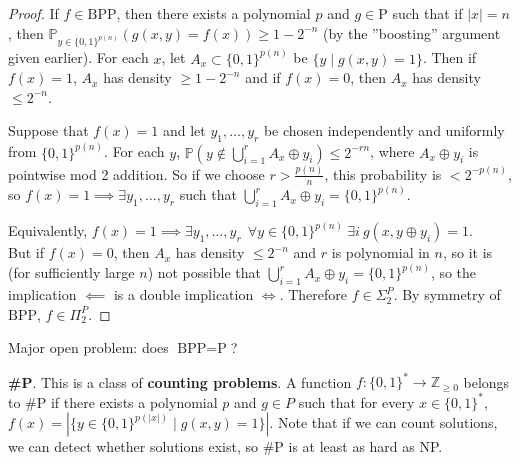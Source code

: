 \documentclass{article}
\theoremstyle{definition}
\begin{document}
\begin{proof}
    If $f \in \text{BPP}$, then there exists a polynomial $p$ and $g \in \text{P}$ such that if $\left|x\right|=n$, then $\mathbb{P}_{y \in \{0,1\}^{p(n)}}\left(g(x,y)=f(x)\right) \ge 1 -2^{-n}$ (by the ''boosting'' argument given earlier). For each $x$, let $A_x \subset \{0,1\}^{p(n)}$ be $\{y \mid g(x,y) =1\}$. Then if $f(x)=1$, $A_x$ has density $\ge 1-2^{-n}$ and if $f(x)=0$, then $A_x$ has density $\le 2^{-n}$. 

    \vspace{1mm}
     
    Suppose that $f(x)=1$ and let $y_1,\ldots,y_r$ be chosen independently and uniformly from $\{0,1\}^{p(n)}$. For each $y$, $\mathbb{P}\left(y \not\in \bigcup_{i=1}^r A_x \oplus y_i \right) \le 2^{-rn}$, where $A_x \oplus y_i$ is pointwise mod 2 addition. So if we choose $r > \frac{p(n)}{n}$, this probability is $<2^{-p(n)}$, so $f(x) = 1 \implies \exists y_1,\ldots,y_r$ such that $\bigcup_{i=1}^r A_x \oplus y_i = \{0,1\}^{p(n)}$.
    \vspace{1mm}
     
    Equivalently, ${f(x)=1 \implies \exists y_1,\ldots,y_r ~ ~\forall y \in \{0,1\}^{p(n)} ~ \exists i ~ g(x, y \oplus y_i) = 1}$.\\
    But if $f(x)=0$, then $A_x$ has density $\le 2^{-n}$ and $r$ is polynomial in $n$, so it is (for sufficiently large $n$) not possible that $\bigcup_{i=1}^r A_x \oplus y_i = \{0,1\}^{p(n)}$, so the implication $\impliedby$ is a double implication $\iff$. Therefore $f \in \Sigma_2^P$. By symmetry of $\text{BPP}$, $f \in \Pi_2^P$.
\end{proof}
Major open problem: does $\text{BPP} = \text{P}$?

\vspace{1mm}
 
\textbf{\#P}. This is a class of \textbf{counting problems}. A function $f : \{0,1\}^* \to \mathbb{Z}_{\ge 0}$ belongs to \#P if there exists a polynomial $p$ and $g \in P$ such that for every $x \in \{0,1\}^*$, $f(x) = \left|\{y \in \{0,1\}^{p(\left|x\right|)} \mid g(x,y)=1\}\right|$. Note that if we can count solutions, we can detect whether solutions exist, so \#P is at least as hard as NP.
\end{document}
